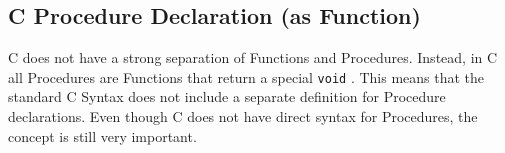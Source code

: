 \clearpage
\subsection{C Procedure Declaration (as Function)} %
\label{sub:c_procedure_declaration_as_function_}

C does not have a strong separation of Functions and Procedures. Instead, in C all Procedures are Functions that return a special \texttt{void} . This means that the standard C Syntax does not include a separate definition for Procedure declarations. Even though C does not have direct syntax for Procedures, the concept is still very important.



